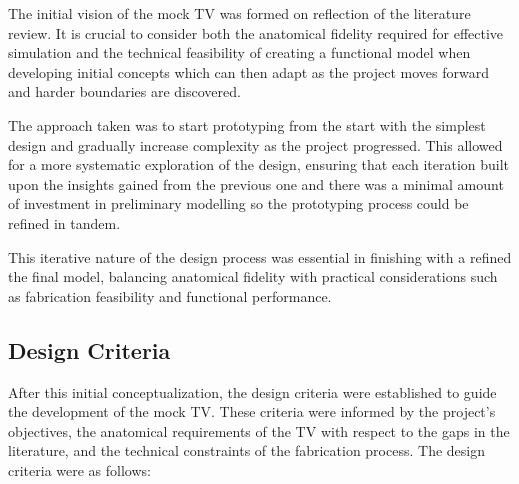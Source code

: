 \mynewline
The initial vision of the mock \gls{TV} was formed on reflection of the literature review. It is crucial to consider both the anatomical fidelity required for effective simulation and the technical feasibility of creating a functional model when developing initial concepts which can then adapt as the project moves forward and harder boundaries are discovered.


The approach taken was to start prototyping from the start with the simplest design and gradually increase complexity as the project progressed. This allowed for a more systematic exploration of the design, ensuring that each iteration built upon the insights gained from the previous one and there was a minimal amount of investment in preliminary modelling so the prototyping process could be refined in tandem.

This iterative nature of the design process was essential in finishing with a refined the final model, balancing anatomical fidelity with practical considerations such as fabrication feasibility and functional performance.


\subsection{Design Criteria}
After this initial conceptualization, the design criteria were established to guide the development of the mock \gls{TV}. These criteria were informed by the project's objectives, the anatomical requirements of the \gls{TV} with respect to the gaps in the literature, and the technical constraints of the fabrication process.
  {The design criteria were as follows:}

